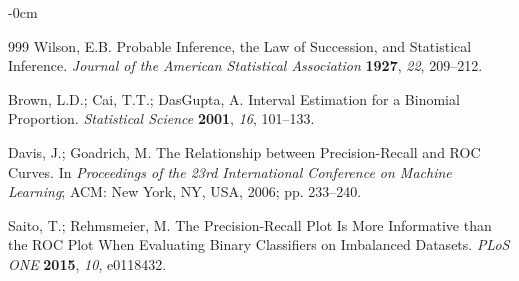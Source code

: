 \documentclass[information,article,submit,moreauthors]{Definitions/mdpi}
\begin{document}
\begin{adjustwidth}{-\extralength}{0cm}
\begin{thebibliography}{999}
Wilson, E.B. Probable Inference, the Law of Succession, and Statistical Inference.
\textit{Journal of the American Statistical Association} \textbf{1927}, \textit{22}, 209--212.

Brown, L.D.; Cai, T.T.; DasGupta, A. Interval Estimation for a Binomial Proportion.
\textit{Statistical Science} \textbf{2001}, \textit{16}, 101--133.

Davis, J.; Goadrich, M. The Relationship between Precision-Recall and ROC Curves. In
\textit{Proceedings of the 23rd International Conference on Machine Learning}; ACM: New York,
NY, USA, 2006; pp. 233--240.

Saito, T.; Rehmsmeier, M. The Precision-Recall Plot Is More Informative than the ROC Plot When
Evaluating Binary Classifiers on Imbalanced Datasets. \textit{PLoS ONE} \textbf{2015},
\textit{10}, e0118432.

\end{thebibliography}

\end{adjustwidth}

\PublishersNote{}
\end{document}
